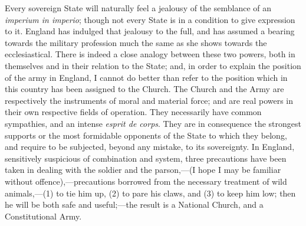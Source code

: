 Every sovereign State will naturally feel a
jealousy of the semblance of an \emph{imperium in imperio}; though not
every State is in a condition to give expression to it. England has
indulged that jealousy to the full, and has assumed a bearing towards
the military profession much the same as she shows towards the
ecclesiastical. There is indeed a close analogy between these two
powers, both in themselves and in their relation to the State;
and, in order to explain the position of the army in England, I cannot
do better than refer to the position which in this country has been
assigned to the Church. The Church and the Army are respectively the
instruments of moral and material force; and are real powers in their
own respective fields of operation. They necessarily have common
sympathies, and an intense \emph{esprit de corps}. They are in
consequence the strongest supports or the most formidable opponents of
the State to which they belong, and require to be subjected, beyond
any mistake, to its sovereignty. In England, sensitively suspicious of
combination and system, three precautions have been taken in dealing
with the soldier and the parson,—(I hope I may be familiar without
offence),—precautions borrowed from the necessary treatment of wild
animals,—(1) to tie him up, (2) to pare his claws, and (3) to keep
him low; then he will be both safe and useful;—the result is a
National Church, and a Constitutional Army.

